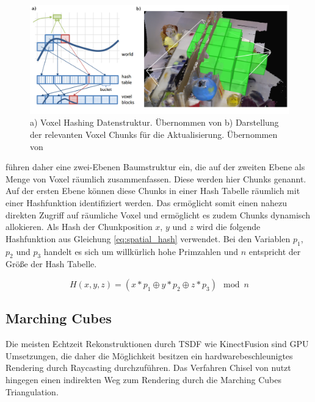 \begin{figure}
  \centering
	\includegraphics[width=1.0\textwidth]{content/images/methods/hashing.png} 
  \caption{a) Voxel Hashing Datenstruktur. Übernommen von \citet{niessner2013real} b) Darstellung der relevanten Voxel Chunks für die Aktualisierung. Übernommen von \citet{Klingensmith_2015_7924}}
  \label{fig:hashing}
\end{figure}

\citet{niessner2013real} führen daher eine zwei-Ebenen Baumstruktur ein, die auf der zweiten Ebene als Menge von Voxel räumlich zusammenfassen. Diese werden hier Chunks genannt. Auf der ersten Ebene können diese Chunks in einer Hash Tabelle räumlich mit einer Hashfunktion identifiziert werden. Das ermöglicht somit einen nahezu direkten Zugriff auf räumliche Voxel und ermöglicht es zudem Chunks dynamisch allokieren. Als Hash der Chunkposition \(x\), \(y\) und \(z\) wird die folgende Hashfunktion aus Gleichung \ref{eq:spatial_hash} verwendet. Bei den Variablen \(p_1\), \(p_2\) und \(p_3\) handelt es sich um willkürlich hohe Primzahlen und \(n\) entspricht der Größe der Hash Tabelle.

\begin{equation}\label{eq:spatial_hash}
H(x,y,z) = (x * p_1 \oplus y * p_2 \oplus z * p_3) \mod n
\end{equation}

\subsection{Marching Cubes}

Die meisten Echtzeit Rekonstruktionen durch TSDF wie KinectFusion sind GPU Umsetzungen, die daher die Möglichkeit besitzen ein hardwarebeschleunigtes Rendering durch Raycasting durchzuführen. Das Verfahren Chisel von \citet{Klingensmith_2015_7924} nutzt hingegen einen indirekten Weg zum Rendering durch die Marching Cubes Triangulation. \\


